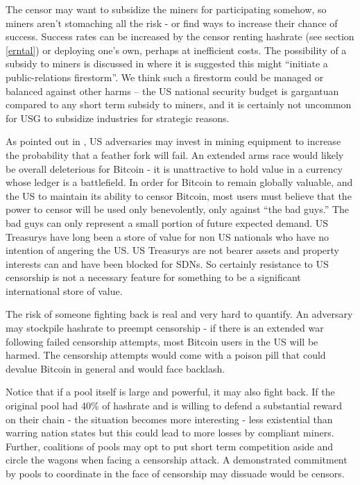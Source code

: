 \documentclass{article}%
\begin{document}
The censor may want to subsidize the miners for participating somehow, so
miners aren't stomaching all the risk - or find ways to increase their chance
of success.  Success rates can be increased by the censor renting hashrate
(see section \ref{erntal}) or deploying one's own, perhaps at inefficient
costs. The possibility of a subsidy to miners is discussed in \cite[pg.
15]{HW} where it is suggested this might \textquotedblleft initiate a
public-relations firestorm''.  We think such a firestorm could be managed or
balanced against other harms -- the US national security budget is gargantuan
compared to any short term subsidy to miners, and it is certainly not uncommon
for USG to subsidize industries for strategic reasons.

As pointed out in \cite{HW}, US adversaries may invest in mining
equipment to increase the probability that a feather fork will fail.  An extended arms race would
likely be overall deleterious for Bitcoin - it is unattractive to hold
value in a currency whose ledger is a battlefield.  In order for Bitcoin to remain
globally valuable, and the US to maintain its ability to censor Bitcoin, most users
must believe that the power to censor will be used only benevolently, only
against ``the bad guys.''  The bad guys can only represent a small portion of
future expected demand.  US Treasurys have long been a store of value for non
US nationals who have no intention of angering the US.  US Treasurys are
not bearer assets and property interests can and have been blocked for SDNs.
 So certainly resistance to US censorship is not a necessary feature for
something to be a significant international store of value.

The risk of someone fighting back is real and very hard to
quantify. An adversary may stockpile hashrate to preempt censorship - if there
is an extended war following failed censorship attempts, most Bitcoin users in
the US will be harmed. The censorship attempts would come with a poison pill
that could devalue Bitcoin in general and would face backlash.

Notice that if a pool itself is large and powerful, it may also fight back.
 If the original pool had 40\% of hashrate and is willing to defend a
substantial reward on their chain - the situation becomes more interesting -
less existential than warring nation states but this could lead to more losses
by compliant miners.  Further, coalitions of pools may opt to put short term
competition aside and circle the wagons when facing a censorship attack.
 A demonstrated commitment by pools to coordinate in the face of
censorship may dissuade would be censors.
\end{document}
